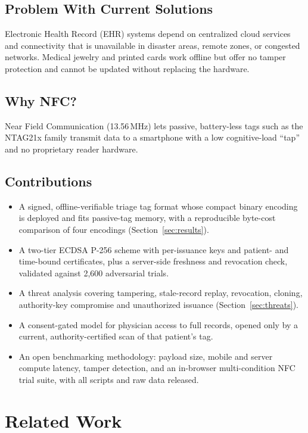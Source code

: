 \documentclass[conference]{IEEEtran}
\begin{document}
\subsection{Problem With Current Solutions}
Electronic Health Record (EHR) systems depend on centralized cloud services and connectivity that is unavailable in disaster areas, remote zones, or congested networks. Medical jewelry and printed cards work offline but offer no tamper protection and cannot be updated without replacing the hardware.

\subsection{Why NFC?}
Near Field Communication (13.56\,MHz) lets passive, battery-less tags such as the NTAG21x family transmit data to a smartphone with a low cognitive-load ``tap'' and no proprietary reader hardware.

\subsection{Contributions}
\begin{itemize}
\item A signed, offline-verifiable triage tag format whose compact binary encoding is deployed and fits passive-tag memory, with a reproducible byte-cost comparison of four encodings (Section~\ref{sec:results}).
\item A two-tier ECDSA P-256 scheme with per-issuance keys and patient- and time-bound certificates, plus a server-side freshness and revocation check, validated against 2{,}600 adversarial trials.
\item A threat analysis covering tampering, stale-record replay, revocation, cloning, authority-key compromise and unauthorized issuance (Section~\ref{sec:threats}).
\item A consent-gated model for physician access to full records, opened only by a current, authority-certified scan of that patient's tag.
\item An open benchmarking methodology: payload size, mobile and server compute latency, tamper detection, and an in-browser multi-condition NFC trial suite, with all scripts and raw data released.
\end{itemize}

\section{Related Work}
\label{sec:related}
\end{document}
